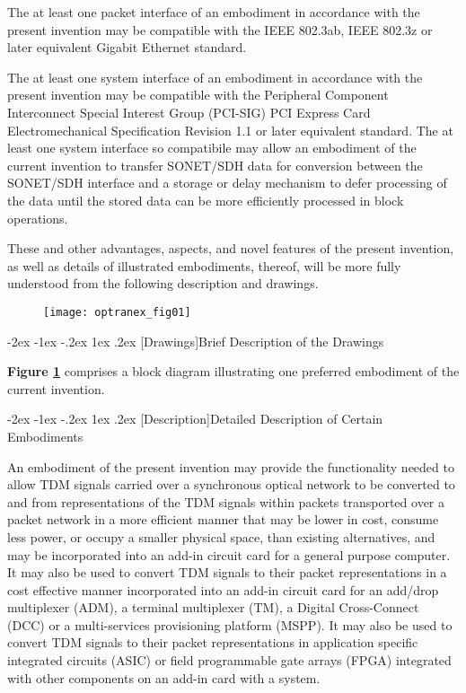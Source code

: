 \documentclass[letterpaper,final,notitlepage,twocolumn,10pt,twoside]{article}
\makeatletter
\let\large = \normalsize
\let\normalsize = \small
\let\small = \footnotesize
\let\footnotesize = \scriptsize
\let\scriptsize = \tiny
\renewcommand\section{\@startsection {section}{1}{\z@}%
                                   {-2ex \@plus -1ex \@minus -.2ex}%
                                   {1ex \@plus .2ex}%
                                   {\normalfont\large\bfseries}}
\makeatother
\begin{document}
The at least one packet interface of an embodiment in accordance with the
present invention may be compatible with the IEEE 802.3ab, IEEE 802.3z or
later equivalent Gigabit Ethernet standard.

The at least one system interface of an embodiment in accordance with the
present invention may be compatible with the Peripheral Component Interconnect
Special Interest Group (PCI-SIG) PCI Express Card Electromechanical
Specification Revision 1.1 or later equivalent standard.  \nocite{PCIeCEM} The
at least one system interface so compatibile may allow an embodiment of the
current invention to transfer SONET/SDH data for conversion between the
SONET/SDH interface and a storage or delay mechanism to defer processing of
the data until the stored data can be more efficiently processed in block
operations.

These and other advantages, aspects, and novel features of the present
invention, as well as details of illustrated embodiments, thereof, will be
more fully understood from the following description and drawings.

\onecolumn
\begin{figure}[htp]
\center\texttt{[image: optranex\_fig01]}
\caption[Figure1]{}
\label{figure:optranex_fig01}
\end{figure}
\twocolumn

\section[Drawings]{Brief Description of the Drawings}

\textbf{Figure \ref{figure:optranex_fig01}} comprises a block diagram
illustrating one preferred embodiment of the current invention.

\section[Description]{Detailed Description of Certain Embodiments}

An embodiment of the present invention may provide the functionality needed to
allow TDM signals carried over a synchronous optical network to be converted
to and from representations of the TDM signals within packets transported over
a packet network in a more efficient manner that may be lower in cost, consume
less power, or occupy a smaller physical space, than existing alternatives,
and may be incorporated into an add-in circuit card for a general purpose
computer.  It may also be used to convert TDM signals to their packet
representations in a cost effective manner incorporated into an add-in circuit
card for an add/drop multiplexer (ADM), a terminal multiplexer (TM), a Digital
Cross-Connect (DCC) or a multi-services provisioning platform (MSPP).  It may
also be used to convert TDM signals to their packet representations in
application specific integrated circuits (ASIC) or field programmable gate
arrays (FPGA) integrated with other components on an add-in card with a
system.
\end{document}
